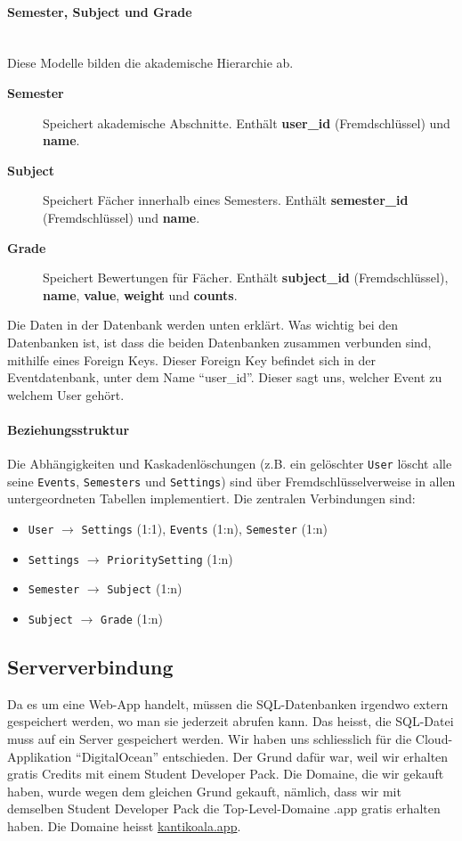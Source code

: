 \documentclass[12pt,a4paper]{report}
\newcommand{\myparagraph}[1]{\paragraph{#1}\mbox{}\\}
\begin{document}
\myparagraph{Semester, Subject und Grade}
Diese Modelle bilden die akademische Hierarchie ab.
\begin{description}
    \item[\textbf{Semester}] Speichert akademische Abschnitte. Enthält \textbf{user\_id} (Fremdschlüssel) und \textbf{name}.
    \item[\textbf{Subject}] Speichert Fächer innerhalb eines Semesters. Enthält \textbf{semester\_id} (Fremdschlüssel) und \textbf{name}.
    \item[\textbf{Grade}] Speichert Bewertungen für Fächer. Enthält \textbf{subject\_id} (Fremdschlüssel), \textbf{name}, \textbf{value}, \textbf{weight} und \textbf{counts}.
\end{description}

Die Daten in der Datenbank werden unten erklärt. Was wichtig bei den Datenbanken ist, ist dass die beiden Datenbanken zusammen verbunden sind, mithilfe eines Foreign Keys. Dieser Foreign Key befindet sich in der Eventdatenbank, unter dem Name \enquote{user\_id}. Dieser sagt uns, welcher Event zu welchem User gehört.

\paragraph{Beziehungsstruktur}
Die Abhängigkeiten und Kaskadenlöschungen (z.B. ein gelöschter \texttt{User} löscht alle seine \texttt{Events}, \texttt{Semesters} und \texttt{Settings}) sind über Fremdschlüsselverweise in allen untergeordneten Tabellen implementiert. Die zentralen Verbindungen sind:
\begin{itemize}
    \item \texttt{User} $\to$ \texttt{Settings} (1:1), \texttt{Events} (1:n), \texttt{Semester} (1:n)
    \item \texttt{Settings} $\to$ \texttt{PrioritySetting} (1:n)
    \item \texttt{Semester} $\to$ \texttt{Subject} (1:n)
    \item \texttt{Subject} $\to$ \texttt{Grade} (1:n)
\end{itemize}

\subsection{Serververbindung}
Da es um eine Web-App handelt, müssen die SQL-Datenbanken irgendwo extern gespeichert werden, wo man sie jederzeit abrufen kann. Das heisst, die SQL-Datei muss auf ein Server gespeichert werden. Wir haben uns schliesslich für die Cloud-Applikation \enquote{DigitalOcean} entschieden. Der Grund dafür war, weil wir erhalten gratis Credits mit einem Student Developer Pack. Die Domaine, die wir gekauft haben, wurde wegen dem gleichen Grund gekauft, nämlich, dass wir mit demselben Student Developer Pack die Top-Level-Domaine .app gratis erhalten haben. Die Domaine heisst \href{https://www.kantikoala.app}{kantikoala.app}.
\end{document}
